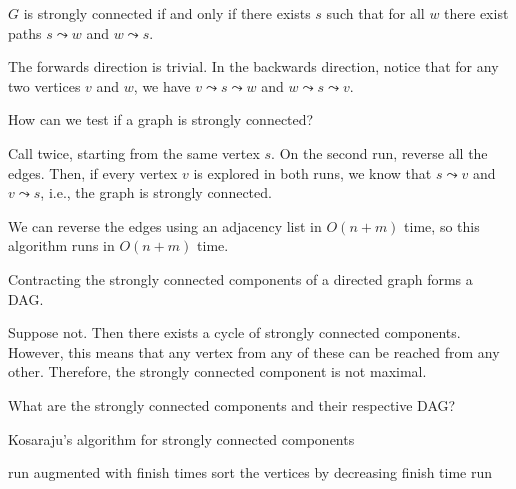 \begin{corollary}
  $G$ is strongly connected if and only if there exists $s$
  such that for all $w$ there exist paths $s \leadsto w$ and $w \leadsto s$.
\end{corollary}
\begin{prf}
  The forwards direction is trivial.
  In the backwards direction, notice that for any two vertices $v$ and $w$,
  we have $v \leadsto s \leadsto w$ and $w \leadsto s \leadsto v$.
\end{prf}

\begin{problem}
  How can we test if a graph is strongly connected?
\end{problem}
\begin{sol}
  Call  twice, starting from the same vertex $s$.
  On the second run, reverse all the edges.
  Then, if every vertex $v$ is explored in both runs,
  we know that $s \leadsto v$ and $v \leadsto s$,
  i.e., the graph is strongly connected.

  We can reverse the edges using an adjacency list in $O(n+m)$ time,
  so this algorithm runs in $O(n+m)$ time.
\end{sol}

\begin{prop}
  Contracting the strongly connected components of a directed graph
  forms a DAG.
\end{prop}
\begin{prf}
  Suppose not. Then there exists a cycle of strongly connected components.
  However, this means that any vertex from any of these can be reached from any other.
  Therefore, the strongly connected component is not maximal.
\end{prf}

\begin{problem}
  What are the strongly connected components and their respective DAG?
\end{problem}
\begin{algorithm}
  \caption{Kosaraju's algorithm for strongly connected components}
  \begin{algorithmic}[1]
      \State run  augmented with finish times
      \State sort the vertices by decreasing finish time
      \State run 
      \State {}
    \EndProcedure
  \end{algorithmic}
\end{algorithm}

